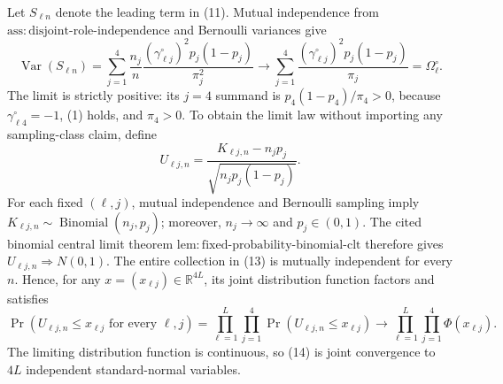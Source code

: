 Let \(S_{\ell n}\) denote the leading term in (11). Mutual independence from \(\mathrm{ass:disjoint\mbox{-}role\mbox{-}independence}\) and Bernoulli variances give
\[
 \operatorname{Var}(S_{\ell n})
 =\sum_{j=1}^4\frac{n_j}{n}
 \frac{(\gamma^{\circ}_{\ell j})^2p_j(1-p_j)}{\pi_j^2}
 \longrightarrow
 \sum_{j=1}^4\frac{(\gamma^{\circ}_{\ell j})^2p_j(1-p_j)}{\pi_j}
 =\Omega^{\circ}_\ell.
\tag{12}
\]
The limit is strictly positive: its \(j=4\) summand is \(p_4(1-p_4)/\pi_4>0\), because \(\gamma^{\circ}_{\ell4}=-1\), (1) holds, and \(\pi_4>0\). To obtain the limit law without importing any sampling-class claim, define
\[
 U_{\ell j,n}=\frac{K_{\ell j,n}-n_jp_j}{\sqrt{n_jp_j(1-p_j)}}.
\tag{13}
\]
For each fixed \((\ell,j)\), mutual independence and Bernoulli sampling imply \(K_{\ell j,n}\sim\operatorname{Binomial}(n_j,p_j)\); moreover, \(n_j\to\infty\) and \(p_j\in(0,1)\). The cited binomial central limit theorem \(\mathrm{lem:fixed\mbox{-}probability\mbox{-}binomial\mbox{-}clt}\) therefore gives \(U_{\ell j,n}\Rightarrow N(0,1)\). The entire collection in (13) is mutually independent for every \(n\). Hence, for any \(x=(x_{\ell j})\in\mathbb R^{4L}\), its joint distribution function factors and satisfies
\[
 \Pr\!\left(U_{\ell j,n}\le x_{\ell j}\text{ for every }\ell,j\right)
 =\prod_{\ell=1}^L\prod_{j=1}^4\Pr(U_{\ell j,n}\le x_{\ell j})
 \longrightarrow\prod_{\ell=1}^L\prod_{j=1}^4\Phi(x_{\ell j}).
\tag{14}
\]
The limiting distribution function is continuous, so (14) is joint convergence to \(4L\) independent standard-normal variables.

